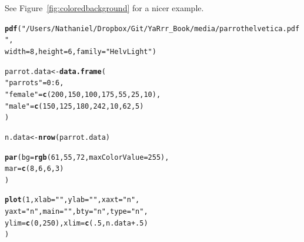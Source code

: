 \documentclass{tufte-book}\usepackage[]{graphicx}\usepackage[]{color}
\makeatletter
\newcommand{\hlnum}[1]{\textcolor[rgb]{0.686,0.059,0.569}{#1}}%
\newcommand{\hlstr}[1]{\textcolor[rgb]{0.192,0.494,0.8}{#1}}%
\newcommand{\hlopt}[1]{\textcolor[rgb]{0,0,0}{#1}}%
\newcommand{\hlstd}[1]{\textcolor[rgb]{0.345,0.345,0.345}{#1}}%
\newcommand{\hlkwb}[1]{\textcolor[rgb]{0.69,0.353,0.396}{#1}}%
\newcommand{\hlkwc}[1]{\textcolor[rgb]{0.333,0.667,0.333}{#1}}%
\newcommand{\hlkwd}[1]{\textcolor[rgb]{0.737,0.353,0.396}{\textbf{#1}}}%
\newenvironment{kframe}{%
 \def\at@end@of@kframe{}%
 \ifinner\ifhmode%
  \def\at@end@of@kframe{\end{minipage}}%
  \begin{minipage}{\columnwidth}%
 \fi\fi%
 \def\FrameCommand##1{\hskip\@totalleftmargin \hskip-\fboxsep
 \colorbox{shadecolor}{##1}\hskip-\fboxsep
     \hskip-\linewidth \hskip-\@totalleftmargin \hskip\columnwidth}%
 \MakeFramed {\advance\hsize-\width
   \@totalleftmargin\z@ \linewidth\hsize
   \@setminipage}}%
 {\par\unskip\endMakeFramed%
 \at@end@of@kframe}
\newenvironment{knitrout}{}{} %
\makeatother
\begin{document}
\begin{itemize}
\begin{knitrout}
\end{knitrout}

See Figure~\ref{fig:coloredbackground} for a nicer example.

\begin{marginfigure}
\begin{tiny}
\begin{knitrout}
\color{fgcolor}\begin{kframe}
\begin{alltt}
\hlkwd{pdf}\hlstd{(}\hlstr{"/Users/Nathaniel/Dropbox/Git/YaRrr_Book/media/parrothelvetica.pdf"}\hlstd{,}
    \hlkwc{width} \hlstd{=} \hlnum{8}\hlstd{,} \hlkwc{height} \hlstd{=} \hlnum{6}\hlstd{,} \hlkwc{family} \hlstd{=} \hlstr{"HelvLight"}\hlstd{)}
\end{alltt}


{\ttfamily\noindent\bfseries{}}\begin{alltt}
\hlstd{parrot.data} \hlkwb{<-} \hlkwd{data.frame}\hlstd{(}
  \hlstr{"parrots"} \hlstd{=} \hlnum{0}\hlopt{:}\hlnum{6}\hlstd{,}
  \hlstr{"female"} \hlstd{=} \hlkwd{c}\hlstd{(}\hlnum{200}\hlstd{,} \hlnum{150}\hlstd{,} \hlnum{100}\hlstd{,} \hlnum{175}\hlstd{,} \hlnum{55}\hlstd{,} \hlnum{25}\hlstd{,} \hlnum{10}\hlstd{),}
  \hlstr{"male"} \hlstd{=} \hlkwd{c}\hlstd{(}\hlnum{150}\hlstd{,} \hlnum{125}\hlstd{,} \hlnum{180}\hlstd{,} \hlnum{242}\hlstd{,} \hlnum{10}\hlstd{,} \hlnum{62}\hlstd{,} \hlnum{5}\hlstd{)}
  \hlstd{)}

\hlstd{n.data} \hlkwb{<-} \hlkwd{nrow}\hlstd{(parrot.data)}

\hlkwd{par}\hlstd{(}\hlkwc{bg} \hlstd{=} \hlkwd{rgb}\hlstd{(}\hlnum{61}\hlstd{,} \hlnum{55}\hlstd{,} \hlnum{72}\hlstd{,} \hlkwc{maxColorValue} \hlstd{=} \hlnum{255}\hlstd{),}
    \hlkwc{mar} \hlstd{=} \hlkwd{c}\hlstd{(}\hlnum{8}\hlstd{,} \hlnum{6}\hlstd{,} \hlnum{6}\hlstd{,} \hlnum{3}\hlstd{)}
    \hlstd{)}

\hlkwd{plot}\hlstd{(}\hlnum{1}\hlstd{,} \hlkwc{xlab} \hlstd{=} \hlstr{""}\hlstd{,} \hlkwc{ylab} \hlstd{=} \hlstr{""}\hlstd{,} \hlkwc{xaxt} \hlstd{=} \hlstr{"n"}\hlstd{,}
     \hlkwc{yaxt} \hlstd{=} \hlstr{"n"}\hlstd{,} \hlkwc{main} \hlstd{=} \hlstr{""}\hlstd{,} \hlkwc{bty} \hlstd{=} \hlstr{"n"}\hlstd{,} \hlkwc{type} \hlstd{=} \hlstr{"n"}\hlstd{,}
     \hlkwc{ylim} \hlstd{=} \hlkwd{c}\hlstd{(}\hlnum{0}\hlstd{,} \hlnum{250}\hlstd{),} \hlkwc{xlim} \hlstd{=} \hlkwd{c}\hlstd{(}\hlnum{.5}\hlstd{, n.data} \hlopt{+} \hlnum{.5}\hlstd{)}
     \hlstd{)}


\end{alltt}
\end{kframe}
\end{knitrout}
\end{tiny}
\end{marginfigure}
\end{itemize}
\end{document}
